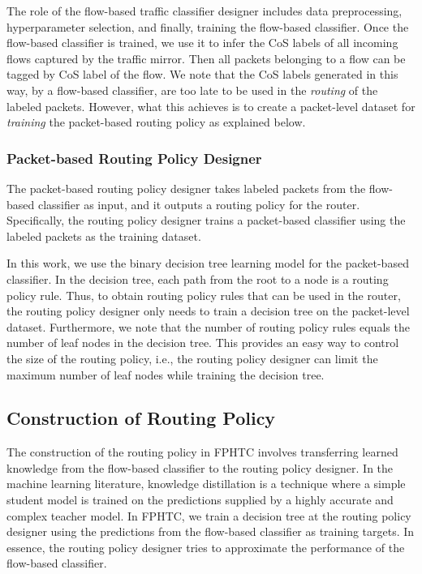 The role of the flow-based traffic classifier designer includes data preprocessing, hyperparameter selection, and finally, training the flow-based classifier. Once the flow-based classifier is trained, we use it to infer the CoS labels of all incoming flows captured by the traffic mirror. Then all packets belonging to a flow can be tagged by CoS label of the flow. We note that the CoS labels generated in this way, by a flow-based classifier, are too late to be used in the \textit{routing} of the labeled packets. However, what this achieves is to create a packet-level dataset for \textit{training} the packet-based routing policy as explained below.

\subsubsection{Packet-based Routing Policy Designer}

The packet-based routing policy designer takes labeled packets from the flow-based classifier as input, and it outputs a routing policy for the router. Specifically,  the routing policy designer trains a packet-based classifier using the labeled packets as the training dataset. 

In this work, we use the binary decision tree learning model for the packet-based classifier. In the decision tree, each path from the root to a node is a routing policy rule. Thus, to obtain routing policy rules that can be used in the router, the routing policy designer only needs to train a decision tree on the packet-level dataset. Furthermore, we note that the number of routing policy rules equals the number of leaf nodes in the decision tree. This provides an easy way to control the size of the routing policy, i.e., the routing policy designer can limit the maximum number of leaf nodes while training the decision tree.

\subsection{Construction of Routing Policy}

The construction of the routing policy in FPHTC involves transferring learned knowledge from the flow-based classifier to the routing policy designer. In the machine learning literature, knowledge distillation \cite{Hinton15, Vapnik16} is a technique where a simple student model is trained on the predictions supplied by a highly accurate and complex teacher model. In FPHTC, we train a decision tree at the routing policy designer using the predictions from the flow-based classifier as training targets. In essence, the routing policy designer tries to approximate the performance of the flow-based classifier. 

